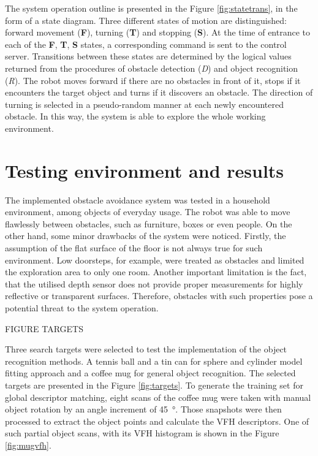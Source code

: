The system operation outline is presented in the Figure \ref{fig:statetrans}, in the form of a state diagram. Three different states of motion are distinguished: forward movement (\textbf{F}), turning (\textbf{T}) and stopping (\textbf{S}). 
At the time of entrance to each of the \textbf{F}, \textbf{T}, \textbf{S} states, a corresponding command is sent to the control server. Transitions between these states are determined by the logical values returned from the procedures of obstacle detection (\textit{D}) and object recognition (\textit{R}). The robot moves forward if there are no obstacles in front of it, stops if it encounters the target object and turns if it discovers an obstacle. The direction of turning is selected in a pseudo-random manner at each newly encountered obstacle. In this way, the system is able to explore the whole working environment. 


\section{Testing environment and results}
\label{sec:testing}


The implemented obstacle avoidance system was tested in a household environment, among objects of everyday usage. The robot was able to move flawlessly between obstacles, such as furniture, boxes or even people. On the other hand, some minor drawbacks of the system were noticed. Firstly, the assumption of the flat surface of the floor is not always true for such environment. Low doorsteps, for example, were treated as obstacles and limited the exploration area to only one room. Another important limitation is the fact, that the utilised depth sensor does not provide proper measurements for highly reflective or transparent surfaces. Therefore, obstacles with such properties pose a potential threat to the system operation.

FIGURE TARGETS

Three search targets were selected to test the implementation of the object recognition methods. A tennis ball and a tin can for sphere and cylinder model fitting approach and a coffee mug for general object recognition. The selected targets are presented in the Figure \ref{fig:targets}. To generate the training set for global descriptor matching, eight scans of the coffee mug were taken with manual object rotation by an angle increment of \SI{45}{\degree}. Those snapshots were then processed to extract the object points and calculate the VFH descriptors. One of such partial object scans, with its VFH histogram is shown in the Figure \ref{fig:mugvfh}.

